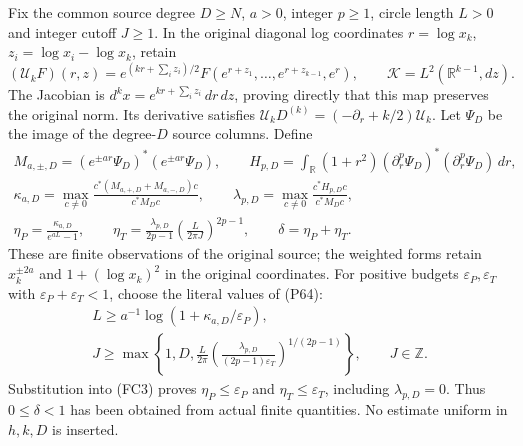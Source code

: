 \documentclass{article}
\begin{document}
Fix the common source degree $D\ge N$, $a>0$, integer $p\ge1$, circle
length $L>0$ and integer cutoff $J\ge1$. In the original diagonal log
coordinates $r=\log x_k$, $z_i=\log x_i-\log x_k$, retain
\[
 (\mathcal U_kF)(r,z)=e^{(kr+\sum_i z_i)/2}
 F(e^{r+z_1},\ldots,e^{r+z_{k-1}},e^r),\qquad
 \mathcal K=L^2(\mathbb R^{k-1},dz).
 \tag{FC2}
\]
The Jacobian is $d^kx=e^{kr+\sum_i z_i}\,dr\,dz$, proving directly that
this map preserves the original norm. Its derivative satisfies
$\mathcal U_kD^{(k)}=(-\partial_r+k/2)\mathcal U_k$.
Let $\Psi_D$ be the image of the degree-$D$ source columns. Define
\[
\begin{gathered}
 M_{a,\pm,D}=(e^{\pm ar}\Psi_D)^*(e^{\pm ar}\Psi_D),\qquad
 H_{p,D}=\int_{\mathbb R}(1+r^2)(\partial_r^p\Psi_D)^*
                  (\partial_r^p\Psi_D)\,dr,\\
 \kappa_{a,D}=\max_{c\ne0}
 \frac{c^*(M_{a,+,D}+M_{a,-,D})c}{c^*M_Dc},\qquad
 \lambda_{p,D}=\max_{c\ne0}\frac{c^*H_{p,D}c}{c^*M_Dc},\\
 \eta_P=\frac{\kappa_{a,D}}{e^{aL}-1},\qquad
 \eta_T=\frac{\lambda_{p,D}}{2p-1}
                   \left(\frac{L}{2\pi J}\right)^{2p-1},\qquad
 \delta=\eta_P+\eta_T .
\end{gathered}\tag{FC3}
\]
These are finite observations of the original source; the weighted forms
retain $x_k^{\pm2a}$ and $1+(\log x_k)^2$ in the original coordinates.
For positive budgets $\varepsilon_P,\varepsilon_T$ with
$\varepsilon_P+\varepsilon_T<1$, choose the literal values of (P64):
\[
\begin{gathered}
 L\ge a^{-1}\log(1+\kappa_{a,D}/\varepsilon_P),\\
 J\ge\max\left\{1,D,\frac{L}{2\pi}
       \left(\frac{\lambda_{p,D}}{(2p-1)\varepsilon_T}
       \right)^{1/(2p-1)}\right\},\qquad J\in\mathbb Z.
\end{gathered}\tag{FC3a}
\]
Substitution into (FC3) proves $\eta_P\le\varepsilon_P$ and
$\eta_T\le\varepsilon_T$, including $\lambda_{p,D}=0$.
Thus $0\le\delta<1$ has been obtained from actual finite quantities.
No estimate uniform in $h,k,D$ is inserted.
\end{document}
